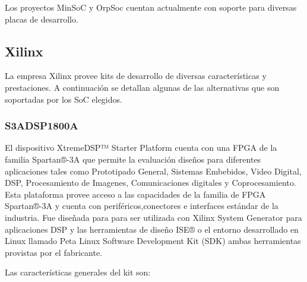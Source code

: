 				Los proyectos MinSoC y OrpSoc cuentan actualmente con soporte para diversas placas de desarrollo. 

				\subsection{Xilinx}
				La empresa Xilinx provee kits de desarrollo de diversas características y prestaciones. A continuación se detallan algunas de las alternativas que
				son soportadas por los SoC elegidos.
				\subsubsection{S3ADSP1800A}
				El dispositivo XtremeDSP™ Starter Platform cuenta con una FPGA de la familia Spartan®-3A que permite la evaluación diseños para diferentes
				aplicaciones tales como Prototipado General, Sistemas Embebidos, Video Digital, DSP, Procesamiento de Imagenes, Comunicaciones digitales y
				Coprocesamiento. Esta plataforma provee acceso a las capacidades de la familia de FPGA Spartan®-3A y cuenta con periféricos,conectores e
				interfaces estándar de la industria. Fue diseñada para para ser utilizada con Xilinx System Generator para aplicaciones DSP y las herramientas de
				diseño ISE® o el entorno desarrollado en Linux llamado Peta Linux Software Development Kit (SDK) ambas herramientas provistas por el fabricante. 
				
				Las características generales del kit son:
			
